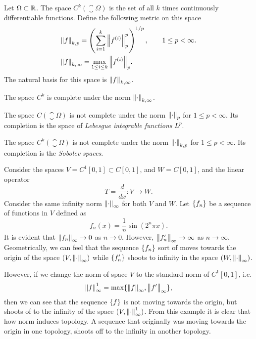 \begin{summary}
	Let $ \Omega \subset \mathbb{R} $. The space $ C^k(\closure{\Omega}) $ is the set of all $ k $ times continuously differentiable functions. Define the following metric on this space
	\begin{align*}
		&\norm{f}_{k,p} = \left( \sum_{i=1}^{k} \norm{f^{(i)}}_p^p \right)^{1/p}, \qquad 1\leq p < \infty. \\
		&\norm{f}_{k,\infty} = \max_{1\leq i \leq k} \norm{f^{(i)}}_p.
	\end{align*}
	The natural basis for this space is $ \norm{f}_{k,\infty} $.
	\begin{proposition}
		The space $ C^k $ is complete under the norm $ \norm{\cdot}_{k,\infty} $.
	\end{proposition}
\end{summary}


\begin{summary}
	The space $ C(\closure{\Omega}) $ is not complete under the norm $ \norm{\cdot}_{p} $ for $ 1\leq p < \infty $. Its completion is the space of \emph{Lebesgue integrable functions} $ L^p $.
\end{summary}
\begin{summary}
	The space $ C^k(\closure{\Omega}) $ is not complete under the norm $ \norm{\cdot}_{k,p} $ for $ 1\leq p < \infty $. Its completion is the \emph{Sobolev spaces}.
\end{summary}

\begin{summary}
	Consider the spaces $ V = C^1[0,1] \subset C[0,1] $, and $ W = C[0,1]$, and the linear operator 
	\[ T = \frac{d}{dx}: V \to W. \]
	Consider the same infinity norm $ \norm{\cdot}_{\infty} $ for both $ V $ and $ W $. Let $ \{f_n\} $ be a sequence of functions in $ V $ defined as
	\[ f_n(x) = \frac{1}{n} \sin(2^n\pi x). \]
	It is evident that $ \norm{f_n}_\infty \to 0 $ as $ n\to 0 $. However, $ \norm{f'_n}_\infty \to \infty $ as $ n\to \infty $. Geometrically, we can feel that the sequence $ \{f_n\} $ sort of moves towards the origin of the space $ (V,\norm{\cdot}_\infty) $ while $ \{f'_n\} $ shoots to infinity in the space $ (W, \norm{\cdot}_\infty) $. 
	
	However, if we change the norm of space $ V $ to the standard norm of $ C^1[0,1] $, i.e.
	\[ \norm{f}_\infty^1 = \max\{\norm{f}_\infty,\norm{f'}_\infty\}, \]
	then we can see that the sequence $ \{f\} $ is not moving towards the origin, but shoots of to the infinity of the space $ (V,\norm{\cdot}_\infty^1) $. From this example it is clear that how norm induces topology. A sequence that originally was moving towards the origin in one topology, shoots off to the infinity in another topology.
\end{summary}

